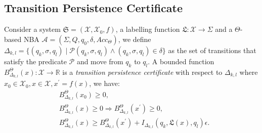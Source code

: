 \documentclass[acmlarge]{acmart}
\begin{document}
  



\subsection{Transition Persistence Certificate}
\begin{definition}
  \label{bsbstct}
  Consider a system $\mathfrak{S} = (\mathcal{X}, \mathcal{X}_0, f)$, a labelling function $\mathfrak{L}:\mathcal{X} \rightarrow \Sigma$ and a $\Theta$-based NBA $\mathcal{A}=(\Sigma, Q, q_0, \delta, Acc_{\Theta})$, we define $\Delta_{k, l} = \{(q_k, \sigma, q_l) \mid \mathcal{P}(q_k, \sigma, q_l) \land (q_k, \sigma, q_l) \in \delta\}$ 
  as the set of transitions that satisfy the predicate $\mathcal{P}$ and move from $q_k$ to $q_l$. 
  A bounded function $B^{\Theta}_{\Delta_{k, l}}(x): \mathcal{X} \rightarrow \mathbb{R}$ is a \emph{transition persistence certificate} with 
  respect to $\Delta_{k,l}$ where $x_0 \in \mathcal{X}_0, x \in \mathcal{X}, x^{\prime} = f(x)$, we have:
  \begin{align}
    &B^{\Theta}_{\Delta_{k, l}}(x_0) \geq 0, \label{bstnn} \\
    &B^{\Theta}_{\Delta_{k, l}}(x) \geq 0 \Rightarrow B^{\Theta}_{\Delta_{k, l}}(x^{\prime}) \geq 0, \label{bsttnn} \\
    &B^{\Theta}_{\Delta_{k, l}}(x) \geq B^{\Theta}_{\Delta_{k, l}}(x^{\prime}) + I_{\Delta_{k,l}}(q_k, \mathfrak{L}(x), q_l)\epsilon. \label{bstni}
  \end{align}
\end{definition}
\end{document}

